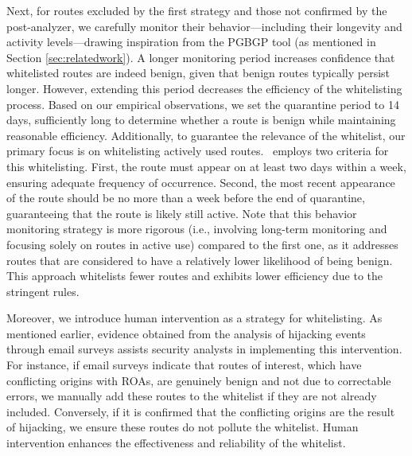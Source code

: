 Next, for routes excluded by the first strategy and those not confirmed by the post-analyzer, we carefully monitor their behavior—including their longevity and activity levels—drawing inspiration from the PGBGP tool (as mentioned in Section \ref{sec:relatedwork}).
A longer monitoring period increases confidence that whitelisted routes are indeed benign, given that benign routes typically persist longer.
However, extending this period decreases the efficiency of the whitelisting process.
Based on our empirical observations, we set the quarantine period to 14 days, sufficiently long to determine whether a route is benign while maintaining reasonable efficiency. Additionally, to guarantee the relevance of the whitelist, our primary focus is on whitelisting actively used routes. \lov\ employs two criteria for this whitelisting. First, the route must appear on at least two days within a week, ensuring adequate frequency of occurrence. Second, the most recent appearance of the route should be no more than a week before the end of quarantine, guaranteeing that the route is likely still active.
Note that this behavior monitoring strategy is more rigorous (i.e., involving long-term monitoring and focusing solely on routes in active use) compared to the first one, as it addresses routes that are considered to have a relatively lower likelihood of being benign.
This approach whitelists fewer routes and exhibits lower efficiency due to the stringent rules.

Moreover, we introduce human intervention as a strategy for whitelisting. As mentioned earlier, evidence obtained from the analysis of hijacking events through email surveys assists security analysts in implementing this intervention. For instance, if email surveys indicate that routes of interest, which have conflicting origins with ROAs, are genuinely benign and not due to correctable errors, we manually add these routes to the whitelist if they are not already included. Conversely, if it is confirmed that the conflicting origins are the result of hijacking, we ensure these routes do not pollute the whitelist. Human intervention enhances the effectiveness and reliability of the whitelist. 



